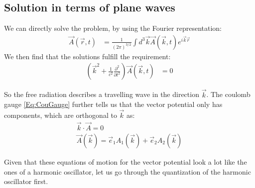 \documentclass[10pt]{article}
\begin{document}
\subsection{Solution in terms of plane waves}

We can directly solve the problem, by using the Fourier representation:
\begin{align}
\vec{A}(\vec{r}, t)&= \frac{1}{(2\pi)^{3/2}}\int d^3\vec{k}\vec{A}(\vec{k},t)e^{i\vec{k}\vec{r}}
\end{align}
We then find that the solutions fulfill the requirement:
\begin{align}
\left(\vec{k}^2 +\frac{1}{c^2} \frac{\partial^2}{\partial t^2}\right)\vec{A}(\vec{k},t)&=0
\end{align}

So the free radiation describes a travelling wave in the direction $\vec{k}$. The coulomb gauge \eqref{Eq:CouGauge} further tells us that the vector potential only has components, which are orthogonal to $\vec{k}$ as:
\begin{align}
\vec{k}\cdot\vec{A} = 0\\
\vec{A}(\vec{k}) = \vec{e}_1 A_1(\vec{k}) + \vec{e}_2 A_2(\vec{k})
\end{align}

Given that these equations of motion for the vector potential look a lot like the ones of a harmonic oscillator, let us go through the quantization of the harmonic oscillator first.
\end{document}
